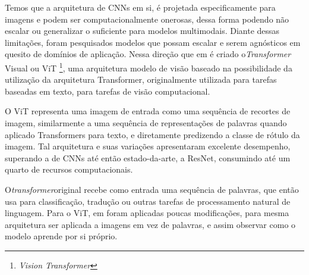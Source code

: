 Temos que a arquitetura de CNNs em si, é projetada especificamente para imagens e podem ser computacionalmente onerosas, dessa forma podendo não escalar ou generalizar o suficiente para modelos multimodais. Diante dessas limitações, foram pesquisados modelos que possam escalar e serem agnósticos em quesito de domínios de aplicação. Nessa direção que em \cite{dosovitskiy2020image} é criado o\textit{Transformer} Visual ou ViT \footnote{\textit{Vision Transformer}}, uma arquitetura modelo de visão baseado na possibilidade da utilização da arquitetura Transformer, originalmente utilizada para tarefas baseadas em texto, para tarefas de visão computacional.

O ViT representa uma imagem de entrada como uma sequência de recortes de imagem, similarmente a uma sequência de representações de palavras quando aplicado Transformers para texto, e diretamente predizendo a classe de rótulo da imagem. Tal arquitetura e suas variações apresentaram excelente desempenho, superando a de CNNs até então estado-da-arte, a ResNet, consumindo até um quarto de recursos computacionais.


O\textit{transformer}original recebe como entrada uma sequência de palavras, que então usa para classificação, tradução ou outras tarefas de processamento natural de linguagem. Para o ViT, em \cite{dosovitskiy2020image} foram aplicadas poucas modificações, para mesma arquitetura ser aplicada a imagens em vez de palavras, e assim observar como o modelo aprende por si próprio.

